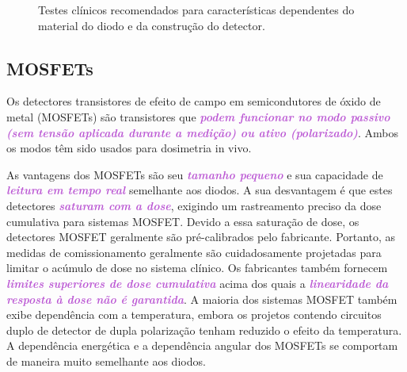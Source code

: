 \documentclass[11pt,a4paper]{article}
\begin{document}
	\begin{figure}[h]
		\centering
		\caption{Testes clínicos recomendados para características dependentes do material do diodo e da construção do detector.}
		\label{fig:testesDiodo}
	\end{figure}

\subsection*{MOSFETs}

	Os detectores transistores de efeito de campo em semicondutores de óxido de metal (MOSFETs) são transistores que \textcolor{MediumOrchid}{\textbf{\textit{podem funcionar no modo passivo (sem tensão aplicada durante a medição) ou ativo (polarizado)}}}. Ambos os modos têm sido usados para dosimetria in vivo.
	
	As vantagens dos MOSFETs são seu \textcolor{MediumOrchid}{\textbf{\textit{tamanho pequeno}}} e sua capacidade de \textcolor{MediumOrchid}{\textbf{\textit{leitura em tempo real}}} semelhante aos diodos. A sua desvantagem é que estes detectores \textcolor{MediumOrchid}{\textbf{\textit{saturam com a dose}}}, exigindo um rastreamento preciso da dose cumulativa para sistemas MOSFET. Devido a essa saturação de dose, os detectores MOSFET geralmente são pré-calibrados pelo fabricante. Portanto, as medidas de comissionamento geralmente são cuidadosamente projetadas para limitar o acúmulo de dose no sistema clínico. Os fabricantes também fornecem \textcolor{MediumOrchid}{\textbf{\textit{limites superiores de dose cumulativa}}} acima dos quais a \textcolor{MediumOrchid}{\textbf{\textit{linearidade da resposta à dose não é garantida}}}. A maioria dos sistemas MOSFET também exibe dependência com a temperatura, embora os projetos contendo circuitos duplo de detector de dupla polarização tenham reduzido o efeito da temperatura. A dependência energética e a dependência angular dos MOSFETs se comportam de maneira muito semelhante aos diodos.
\end{document}
